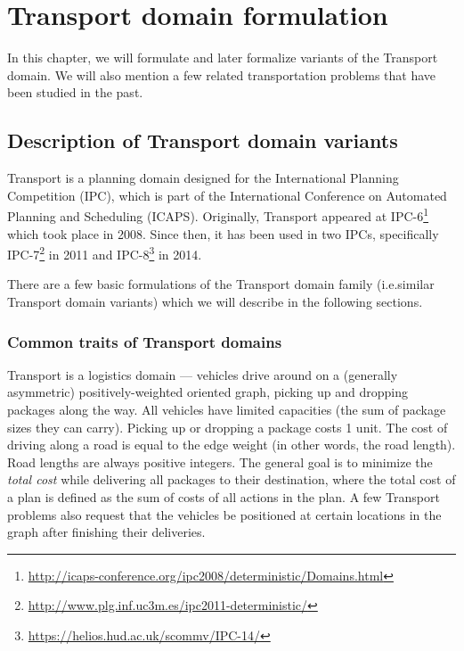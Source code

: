 \chapter{Transport domain formulation}

In this chapter, we will formulate and later formalize variants of the Transport domain. We will also mention a few related transportation problems that have been studied in the past.

\section{Description of Transport domain variants}\label{domain-desc}

Transport is a planning domain designed for
the International Planning
Competition
(IPC), which is part of the International Conference on Automated Planning and
Scheduling
(ICAPS).
Originally, Transport appeared at 
IPC-6\footnote{\url{http://icaps-conference.org/ipc2008/deterministic/Domains.html}} which took place in 2008.
Since then, it has been used in two IPCs,
specifically IPC-7\footnote{\url{http://www.plg.inf.uc3m.es/ipc2011-deterministic/}} in 2011
and IPC-8\footnote{\url{https://helios.hud.ac.uk/scommv/IPC-14/}} in 2014.

There are a few basic formulations of the Transport domain family (i.e.\;similar Transport domain variants) which we will describe in the following sections.

\subsection{Common traits of Transport domains}

Transport is a logistics domain --- vehicles drive around on a (generally asymmetric) positively-weighted oriented graph, picking up and dropping packages along the way.
All vehicles have limited capacities (the sum of package sizes they can carry).
Picking up or dropping a package costs 1 unit. The cost of driving along a road is equal to the edge weight
(in other words, the road length).
Road lengths are always positive integers.
The general goal is to minimize the \textit{total cost}
while delivering all packages to their destination, where
the total cost of a plan is defined as the sum of costs of all actions in
the plan.
A few Transport problems also request that the vehicles be positioned at certain
locations in the graph
after finishing their deliveries.

